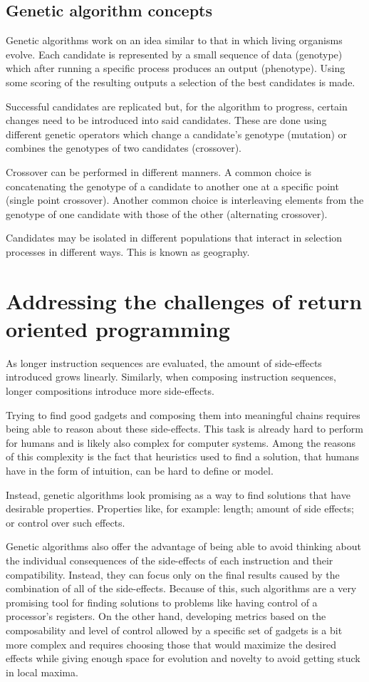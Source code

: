 \documentclass{article}
\begin{document}
\subsection{Genetic algorithm concepts}
Genetic algorithms work on an idea similar to that in which living organisms evolve. Each candidate is represented by a small sequence of data (genotype) which after running a specific process produces an output (phenotype). Using some scoring of the resulting outputs a selection of the best candidates is made.

Successful candidates are replicated but, for the algorithm to progress, certain changes need to be introduced into said candidates. These are done using different genetic operators which change a candidate's genotype (mutation) or combines the genotypes of two candidates (crossover).

Crossover can be performed in different manners. A common choice is concatenating the genotype of a candidate to another one at a specific point (single point crossover). Another common choice is interleaving elements from the genotype of one candidate with those of the other (alternating crossover).

Candidates may be isolated in different populations that interact in selection processes in different ways. This is known as geography.

\section{Addressing the challenges of return oriented programming}
As longer instruction sequences are evaluated, the amount of side-effects introduced grows linearly. Similarly, when composing instruction sequences, longer compositions introduce more side-effects.

Trying to find good gadgets and composing them into meaningful chains requires being able to reason about these side-effects. This task is already hard to perform for humans and is likely also complex for computer systems. Among the reasons of this complexity is the fact that heuristics used to find a solution, that humans have in the form of intuition, can be hard to define or model.

Instead, genetic algorithms look promising as a way to find solutions that have desirable properties. Properties like, for example: length; amount of side effects; or control over such effects.

Genetic algorithms also offer the advantage of being able to avoid thinking about the individual consequences of the side-effects of each instruction and their compatibility. Instead, they can focus only on the final results caused by the combination of all of the side-effects. Because of this, such algorithms are a very promising tool for finding solutions to problems like having control of a processor's registers. On the other hand, developing metrics based on the composability and level of control allowed by a specific set of gadgets is a bit more complex and requires choosing those that would maximize the desired effects while giving enough space for evolution and novelty to avoid getting stuck in local maxima.
\end{document}
